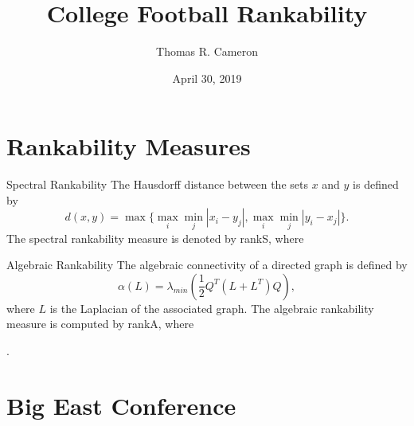 \documentclass{beamer}
\title{College Football Rankability}
\author{Thomas R. Cameron}
\institute{Davidson College}
\date{April 30, 2019}
\newlength\myindent
\newcommand\bindent{%
  \begingroup
  \setlength{\itemindent}{\myindent}
  \addtolength{\algorithmicindent}{\myindent}
}
\newcommand\eindent{\endgroup}
\newcommand\abs[1]{\left|#1\right|}
\begin{document}
\begin{frame}
	\titlepage
\end{frame}


\section{Rankability Measures}

\begin{frame}{Spectral Rankability}
\vfill
The Hausdorff distance between the sets $x$ and $y$ is defined by
\vfill
\[
d(x,y) = \max\{ \max_{i}\min_{j}\abs{x_{i}-y_{j}}, \max_{i}\min_{j}\abs{y_{i}-x_{j}} \}.
\]
\vfill
The spectral rankability measure is denoted by rankS, where
\vfill
\begin{algorithmic}
\bindent
{}
\eindent
\end{algorithmic}
\vfill
\end{frame}

\begin{frame}{Algebraic Rankability}
\vfill
The algebraic connectivity of a directed graph is defined by
\[
\alpha(L) = \lambda_{min}\left(\frac{1}{2}Q^{T}(L+L^{T})Q\right),
\]
where $L$ is the Laplacian of the associated graph. 
\vfill
The algebraic rankability measure is computed by rankA, where
\vfill
\begin{algorithmic}
\bindent
{}
.
\STATE{$r=\abs{\alpha(\mathcal{L})-\alpha(L)}$} 
\eindent
\end{algorithmic}
\vfill
\end{frame}

\section{Big East Conference}
\end{document}
